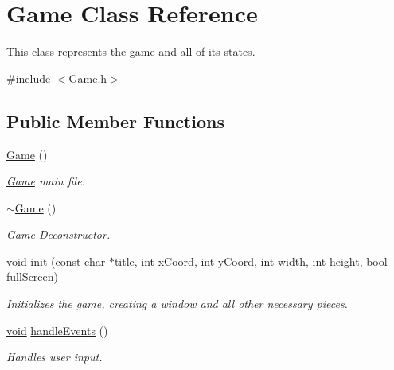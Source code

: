 \hypertarget{class_game}{}\section{Game Class Reference}
\label{class_game}


This class represents the game and all of its states.  




{\ttfamily \#include $<$Game.\+h$>$}

\subsection*{Public Member Functions}
\begin{DoxyCompactItemize}
\item 
\mbox{\hyperlink{class_game_ad59df6562a58a614fda24622d3715b65}{Game}} ()
\begin{DoxyCompactList}\small\item\em \mbox{\hyperlink{class_game}{Game}} main file. \end{DoxyCompactList}\item 
\mbox{\hyperlink{class_game_ae3d112ca6e0e55150d2fdbc704474530}{$\sim$\+Game}} ()
\begin{DoxyCompactList}\small\item\em \mbox{\hyperlink{class_game}{Game}} Deconstructor. \end{DoxyCompactList}\item 
\mbox{\hyperlink{_s_d_l__opengles2__gl2ext_8h_ae5d8fa23ad07c48bb609509eae494c95}{void}} \mbox{\hyperlink{class_game_ad1e6a351dffab1beb330bb814b9ba1a6}{init}} (const char $\ast$title, int x\+Coord, int y\+Coord, int \mbox{\hyperlink{_s_d_l__opengl_8h_a9a82cf3caff84cabc4598e2619faac17}{width}}, int \mbox{\hyperlink{_s_d_l__opengl_8h_aa352f2804b9902ac30769c00dde75d5f}{height}}, bool full\+Screen)
\begin{DoxyCompactList}\small\item\em Initializes the game, creating a window and all other necessary pieces. \end{DoxyCompactList}\item 
\mbox{\hyperlink{_s_d_l__opengles2__gl2ext_8h_ae5d8fa23ad07c48bb609509eae494c95}{void}} \mbox{\hyperlink{class_game_adb5563f62c0c82e3e42ec36501aa5698}{handle\+Events}} ()
\begin{DoxyCompactList}\small\item\em Handles user input. \end{DoxyCompactList}\item 

\end{DoxyCompactItemize}
